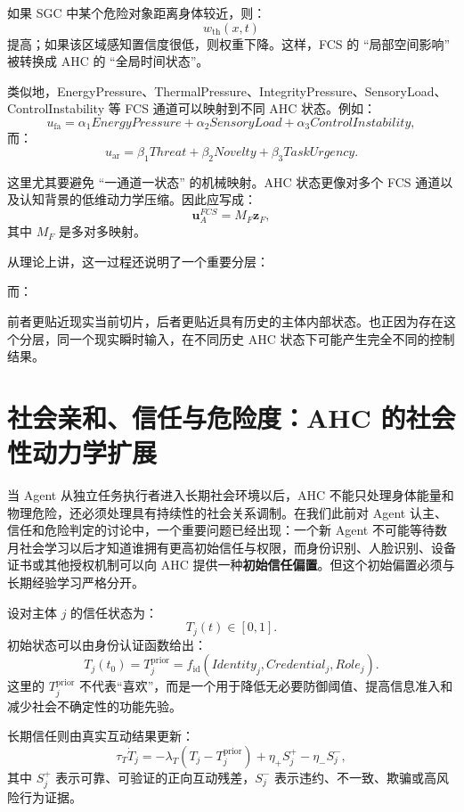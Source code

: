 如果 SGC 中某个危险对象距离身体较近，则：
\[
w_{\mathrm{th}}(x,t)
\]
提高；如果该区域感知置信度很低，则权重下降。这样，FCS 的 ``局部空间影响'' 被转换成 AHC 的 ``全局时间状态''。

类似地，EnergyPressure、ThermalPressure、IntegrityPressure、SensoryLoad、ControlInstability 等 FCS 通道可以映射到不同 AHC 状态。例如：
\[
u_{\mathrm{fa}}
=
\alpha_1
EnergyPressure
+
\alpha_2
SensoryLoad
+
\alpha_3
ControlInstability,
\]
而：
\[
u_{\mathrm{ar}}
=
\beta_1
Threat
+
\beta_2
Novelty
+
\beta_3
TaskUrgency.
\]

这里尤其要避免 ``一通道一状态'' 的机械映射。AHC 状态更像对多个 FCS 通道以及认知背景的低维动力学压缩。因此应写成：
\[
\mathbf u_A^{FCS}
=
M_F
\mathbf z_F,
\]
其中 $M_F$ 是多对多映射。

从理论上讲，这一过程还说明了一个重要分层：
\begin{statementbox}
\centering
{}
\end{statementbox}
而：
\begin{statementbox}
\centering
{}
\end{statementbox}
前者更贴近现实当前切片，后者更贴近具有历史的主体内部状态。也正因为存在这个分层，同一个现实瞬时输入，在不同历史 AHC 状态下可能产生完全不同的控制结果。


\section{社会亲和、信任与危险度：AHC 的社会性动力学扩展}

当 Agent 从独立任务执行者进入长期社会环境以后，AHC 不能只处理身体能量和物理危险，还必须处理具有持续性的社会关系调制。在我们此前对 Agent 认主、信任和危险判定的讨论中，一个重要问题已经出现：一个新 Agent 不可能等待数月社会学习以后才知道谁拥有更高初始信任与权限，而身份识别、人脸识别、设备证书或其他授权机制可以向 AHC 提供一种\textbf{初始信任偏置}。但这个初始偏置必须与长期经验学习严格分开。

设对主体 $j$ 的信任状态为：
\[
T_j(t)\in[0,1].
\]
初始状态可以由身份认证函数给出：
\[
T_j(t_0)
=
T_j^{\mathrm{prior}}
=
f_{\mathrm{id}}(
Identity_j,
Credential_j,
Role_j
).
\]
这里的 $T_j^{\mathrm{prior}}$ 不代表``喜欢''，而是一个用于降低无必要防御阈值、提高信息准入和减少社会不确定性的功能先验。

长期信任则由真实互动结果更新：
\[
\tau_T
\dot T_j
=
-\lambda_T
\left(
T_j-T_j^{\mathrm{prior}}
\right)
+
\eta_+
S_j^+
-
\eta_-
S_j^-,
\]
其中 $S_j^+$ 表示可靠、可验证的正向互动残差，$S_j^-$ 表示违约、不一致、欺骗或高风险行为证据。

